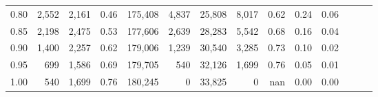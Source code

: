 \begin{tabular}{rrrrrrrrrrrrrr}
0.80 &   2,552 &  2,161 &  0.46 &  175,408 &    4,837 &  25,808 &   8,017 &  0.62 &  0.24 &      0.06 \\
0.85 &   2,198 &  2,475 &  0.53 &  177,606 &    2,639 &  28,283 &   5,542 &  0.68 &  0.16 &      0.04 \\
0.90 &   1,400 &  2,257 &  0.62 &  179,006 &    1,239 &  30,540 &   3,285 &  0.73 &  0.10 &      0.02 \\
0.95 &     699 &  1,586 &  0.69 &  179,705 &      540 &  32,126 &   1,699 &  0.76 &  0.05 &      0.01 \\
1.00 &     540 &  1,699 &  0.76 &  180,245 &        0 &  33,825 &       0 &   nan &  0.00 &      0.00 \\
\bottomrule
\end{tabular}
